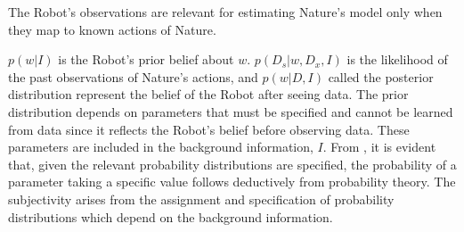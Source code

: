 \begin{axiom}
	\label{ax:observation_relevance}
	The Robot's observations are relevant for estimating Nature's model only when they map to known actions of Nature.
\end{axiom}

$p(w|I)$ is the Robot's prior belief about $w$. $p(D_s|w,D_x,I)$ is the likelihood of the past observations of Nature's actions, and $p(w|D,I)$ called the posterior distribution represent the belief of the Robot after seeing data. The prior distribution depends on parameters that must be specified and cannot be learned from data since it reflects the Robot's belief before observing data. These parameters are included in the background information, $I$. From , it is evident that, given the relevant probability distributions are specified, the probability of a parameter taking a specific value follows deductively from probability theory. The subjectivity arises from the assignment and specification of probability distributions which depend on the background information.
